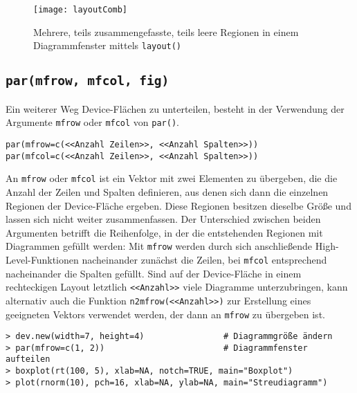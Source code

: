 \begin{figure}[ht]
\centering
\texttt{[image: layoutComb]}
\vspace*{-1em}
\caption{Mehrere, teils zusammengefasste, teils leere Regionen in einem Diagrammfenster mittels \lstinline!layout()!}
\label{fig:layoutComb}
\end{figure}

\subsection{\texttt{par(mfrow, mfcol, fig)}}
\label{sec:parMfRow}

Ein weiterer Weg Device-Flächen zu unterteilen, besteht in der Verwendung der Argumente \lstinline!mfrow! oder \lstinline!mfcol! von \lstinline!par()!.
\begin{lstlisting}
par(mfrow=c(<<Anzahl Zeilen>>, <<Anzahl Spalten>>))
par(mfcol=c(<<Anzahl Zeilen>>, <<Anzahl Spalten>>))
\end{lstlisting}

An \lstinline!mfrow! oder \lstinline!mfcol! ist ein Vektor mit zwei Elementen zu übergeben, die die Anzahl der Zeilen und Spalten definieren, aus denen sich dann die einzelnen Regionen der Device-Fläche ergeben. Diese Regionen besitzen dieselbe Größe und lassen sich nicht weiter zusammenfassen. Der Unterschied zwischen beiden Argumenten betrifft die Reihenfolge, in der die entstehenden Regionen mit Diagrammen gefüllt werden: Mit \lstinline!mfrow! werden durch sich anschließende High-Level-Funktionen nacheinander zunächst die Zeilen, bei \lstinline!mfcol! entsprechend nacheinander die Spalten gefüllt. Sind auf der Device-Fläche in einem rechteckigen Layout letztlich \lstinline!<<Anzahl>>! viele Diagramme unterzubringen, kann alternativ auch die Funktion \lstinline!n2mfrow(<<Anzahl>>)! zur Erstellung eines geeigneten Vektors verwendet werden, der dann an \lstinline!mfrow! zu übergeben ist.
\begin{lstlisting}
> dev.new(width=7, height=4)                # Diagrammgröße ändern
> par(mfrow=c(1, 2))                        # Diagrammfenster aufteilen
> boxplot(rt(100, 5), xlab=NA, notch=TRUE, main="Boxplot")
> plot(rnorm(10), pch=16, xlab=NA, ylab=NA, main="Streudiagramm")
\end{lstlisting}


